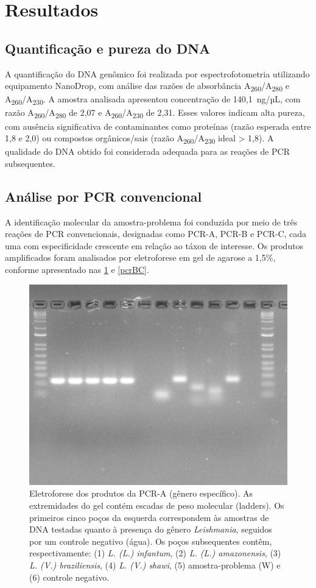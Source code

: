 \section{Resultados}

\subsection{Quantificação e pureza do DNA} A quantificação do DNA genômico foi
realizada por espectrofotometria utilizando equipamento NanoDrop, com análise
das razões de absorbância A\textsubscript{260}/A\textsubscript{280} e
A\textsubscript{260}/A\textsubscript{230}.  A amostra analisada apresentou
concentração de 140{,}1~ng/µL, com razão
A\textsubscript{260}/A\textsubscript{280} de 2{,}07 e
A\textsubscript{260}/A\textsubscript{230} de 2{,}31. Esses valores indicam alta
pureza, com ausência significativa de contaminantes como proteínas (razão
esperada entre 1{,}8 e 2{,}0) ou compostos orgânicos/sais (razão
A\textsubscript{260}/A\textsubscript{230} ideal > 1{,}8)\cite{Alguém}. A
qualidade do DNA obtido foi considerada adequada para as reações de PCR
subsequentes.

\subsection{Análise por PCR convencional} A identificação molecular da
amostra-problema foi conduzida por meio de três reações de PCR convencionais,
designadas como PCR-A, PCR-B e PCR-C, cada uma com especificidade crescente em
relação ao táxon de interesse. Os produtos amplificados foram analisados por
eletroforese em gel de agarose a 1{,}5\%, conforme apresentado nas
\cref{pcrA} e \cref{pcrBC}.

\begin{figure}
 \centering
 \includegraphics[width=.4\textwidth]{fig/pcrA_rflp_g8.jpg}
 \caption{Eletroforese dos produtos da PCR-A (gênero específico). As extremidades do gel contém escadas de peso molecular (ladders). 
 Os primeiros cinco poços da esquerda correspondem às amostras de DNA testadas quanto à presença do gênero \textit{Leishmania}, 
 seguidos por um controle negativo (água). Os poços subsequentes contêm, respectivamente: (1) \textit{L. (L.) infantum}, 
 (2) \textit{L. (L.) amazonensis}, (3) \textit{L. (V.) braziliensis}, (4) \textit{L. (V.) shawi}, (5) amostra-problema (W) e (6) controle negativo.}
 \label{pcrA}
 \end{figure}

